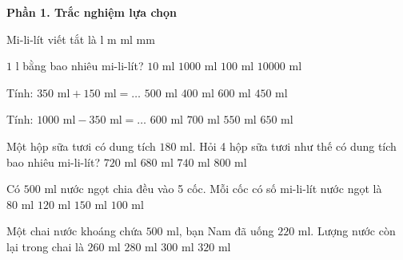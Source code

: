 \textbf{Phần 1. Trắc nghiệm lựa chọn}

\begin{ex} %
Mi-li-lít viết tắt là
\choice
{$\text{l}$}
{$\text{m}$}
{\True $\text{ml}$}
{$\text{mm}$}
\end{ex}

\begin{ex} %
$1\text{ l}$ bằng bao nhiêu mi-li-lít?
\choice
{$10\text{ ml}$}
{\True $1000\text{ ml}$}
{$100\text{ ml}$}
{$10000\text{ ml}$}
\end{ex}

\begin{ex} %
Tính: $350\text{ ml} + 150\text{ ml} = \dots$
\choice
{\True $500\text{ ml}$}
{$400\text{ ml}$}
{$600\text{ ml}$}
{$450\text{ ml}$}
\end{ex}

\begin{ex} %
Tính: $1000\text{ ml} - 350\text{ ml} = \dots$
\choice
{$600\text{ ml}$}
{$700\text{ ml}$}
{$550\text{ ml}$}
{\True $650\text{ ml}$}
\end{ex}

\begin{ex} %
Một hộp sữa tươi có dung tích $180\text{ ml}$. Hỏi 4 hộp sữa tươi như thế có dung tích bao nhiêu mi-li-lít?
\choice
{\True $720\text{ ml}$}
{$680\text{ ml}$}
{$740\text{ ml}$}
{$800\text{ ml}$}
\end{ex}

\begin{ex} %
Có $500\text{ ml}$ nước ngọt chia đều vào 5 cốc. Mỗi cốc có số mi-li-lít nước ngọt là
\choice
{$80\text{ ml}$}
{$120\text{ ml}$}
{$150\text{ ml}$}
{\True $100\text{ ml}$}
\end{ex}

\begin{ex} %
Một chai nước khoáng chứa $500\text{ ml}$, bạn Nam đã uống $220\text{ ml}$. Lượng nước còn lại trong chai là
\choice
{$260\text{ ml}$}
{\True $280\text{ ml}$}
{$300\text{ ml}$}
{$320\text{ ml}$}
\end{ex}

